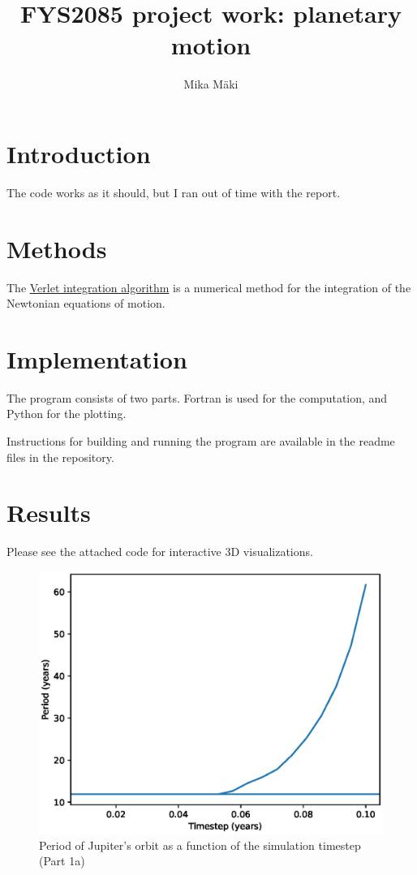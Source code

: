 \documentclass[a4paper]{article}
\title{FYS2085 project work: planetary motion}
\author{Mika Mäki}
\begin{document}
\maketitle
\tableofcontents

\section*{Introduction}
The code works as it should, but I ran out of time with the report.


\section{Methods}
The
\href{https://en.wikipedia.org/wiki/Verlet_integration}{Verlet integration algorithm}
is a numerical method for the integration of the Newtonian equations of motion.



\section{Implementation}
The program consists of two parts.
Fortran is used for the computation, and Python for the plotting.

Instructions for building and running the program are available in the readme files in the repository.



\clearpage
\section{Results}
Please see the attached code for interactive 3D visualizations.

\begin{figure}[ht!]
\includegraphics[width=\textwidth]{fig_1a.eps}
\caption{Period of Jupiter's orbit as a function of the simulation timestep (Part 1a)}
\end{figure}
\end{document}
